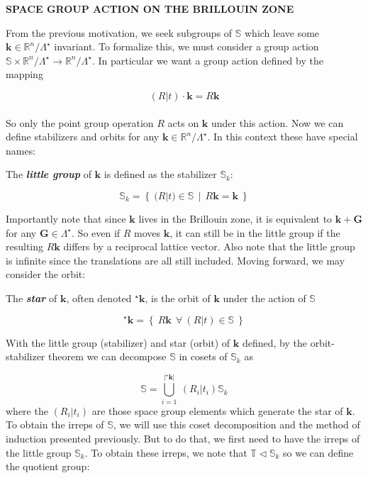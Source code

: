 \documentclass[9 pt]{report}
\def\*#1{\boldsymbol{#1}}
\begin{document}
\begin{center}
	\textbf{SPACE GROUP ACTION ON THE BRILLOUIN ZONE}
\end{center}



From the previous motivation, we seek subgroups of $\mathbb{S}$ which leave some $\*k\in\mathbb{R}^n/\Lambda^\star$ invariant. To formalize this, we must consider a group action $\mathbb{S}\times \mathbb{R}^n/\Lambda^\star \to \mathbb{R}^n/\Lambda^\star$. In particular we want a group action defined by the mapping

$$ (R|t)\cdot \*k = R\*k $$
\\
So only the point group operation $R$ acts on $\*k$ under this action. Now we can define stabilizers and orbits for any $\*k \in \mathbb{R}^n/\Lambda^\star$. In this context these have special names:

\begin{tcolorbox}
	
	The \textbf{\emph{little group}} of $\*k$ is defined as the stabilizer $\mathbb{S}_k$:
	
	$$ \mathbb{S}_k = \left\{ \:(R|t)\in \mathbb{S} \:\:|\:\: R\*k = \*k \:  \right\} $$ 
	
\end{tcolorbox}
Importantly note that since $\*k$ lives in the Brillouin zone, it is equivalent to $\*k+\*G$ for any $\*G\in \Lambda^\star$. So even if $R$ moves $\*k$, it can still be in the little group if the resulting $R \*k$ differs by a reciprocal lattice vector. Also note that the little group is infinite since the translations are all still included. Moving forward, we may consider the orbit:

\begin{tcolorbox}
	The \textbf{\emph{star}} of $\*k$, often denoted $^\star\*k$, is the orbit of $\*k$ under the action of $\mathbb{S}$
	
	$$ ^\star\*k = \left\{ \: R\*k \:\:\forall \:(R|t)\in\mathbb{S} \: \right\} $$
\end{tcolorbox}
With the little group (stabilizer) and star (orbit) of $\*k$ defined, by the orbit-stabilizer theorem we can decompose $\mathbb{S}$ in cosets of $\mathbb{S}_k$ as

$$ \mathbb{S} = \bigcup_{i=1}^{|^\star\*k|} \:(R_i|t_i)\mathbb{S}_k $$
where the $(R_i|t_i)$ are those space group elements which generate the star of $\*k$. To obtain the irreps of $\mathbb{S}$, we will use this coset decomposition and the method of induction presented previously. But to do that, we first need to have the irreps of the little group $\mathbb{S}_k$. To obtain these irreps, we note that $\mathbb{T}\triangleleft\mathbb{S}_k$ so we can define the quotient group:
\end{document}
